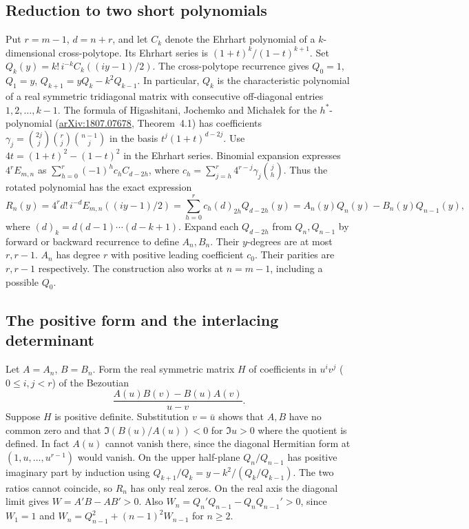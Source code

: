 \subsection*{Reduction to two short polynomials}
Put $r=m-1$, $d=n+r$, and let $C_k$ denote the Ehrhart polynomial of a $k$-dimensional
cross-polytope. Its Ehrhart series is $(1+t)^k/(1-t)^{k+1}$.
Set $Q_k(y)=k!\,i^{-k}C_k((iy-1)/2)$. The cross-polytope recurrence
gives $Q_0=1$, $Q_1=y$, $Q_{k+1}=yQ_k-k^2Q_{k-1}$.
In particular, $Q_k$ is the characteristic polynomial of a real symmetric
tridiagonal matrix with consecutive off-diagonal entries $1,2,\ldots,k-1$.
The formula of Higashitani, Jochemko and Michałek for the $h^*$-polynomial
(\href{https://arxiv.org/abs/1807.07678}{arXiv:1807.07678}, Theorem~4.1)
has coefficients $\gamma_j=\binom{2j}{j}\binom{r}{j}\binom{n-1}{j}$ in the
basis $t^j(1+t)^{d-2j}$. Use $4t=(1+t)^2-(1-t)^2$ in the Ehrhart series.
Binomial expansion expresses $4^rE_{m,n}$ as
$\sum_{h=0}^r(-1)^h c_h C_{d-2h}$, where
$c_h=\sum_{j=h}^r4^{r-j}\gamma_j\binom{j}{h}$.
Thus the rotated polynomial has the exact expression
\[
 R_n(y)=4^r d!\,i^{-d} E_{m,n}((iy-1)/2)
       =\sum_{h=0}^r c_h(d)_{2h}Q_{d-2h}(y)
       =A_n(y)Q_n(y)-B_n(y)Q_{n-1}(y),
\]
where $(d)_k=d(d-1)\cdots(d-k+1)$. Expand each $Q_{d-2h}$ from
$Q_n,Q_{n-1}$ by forward or backward recurrence to define $A_n,B_n$.
Their $y$-degrees are at most $r,r-1$. $A_n$ has degree $r$ with
positive leading coefficient $c_0$. Their parities are $r,r-1$ respectively.
The construction also works at $n=m-1$, including a possible $Q_0$.

\subsection*{The positive form and the interlacing determinant}
Let $A=A_n$, $B=B_n$. Form the real symmetric matrix $H$ of coefficients in
$u^iv^j$ ($0\le i,j<r$) of the Bezoutian
\[
 \frac{A(u)B(v)-B(u)A(v)}{u-v}.
\]
Suppose $H$ is positive definite. Substitution $v=\bar u$ shows that
$A,B$ have no common zero and that $\Im(B(u)/A(u))<0$ for $\Im u>0$
where the quotient is defined. In fact $A(u)$ cannot vanish there, since
the diagonal Hermitian form at $(1,u,\ldots,u^{r-1})$ would vanish.
On the upper half-plane $Q_n/Q_{n-1}$ has positive imaginary part by
induction using $Q_{k+1}/Q_k=y-k^2/(Q_k/Q_{k-1})$.
The two ratios cannot coincide, so $R_n$ has only real zeros.
On the real axis the diagonal limit gives $W=A'B-AB'>0$.
Also $W_n=Q_n'Q_{n-1}-Q_nQ_{n-1}'>0$, since $W_1=1$ and
$W_n=Q_{n-1}^2+(n-1)^2W_{n-1}$ for $n\ge2$.

